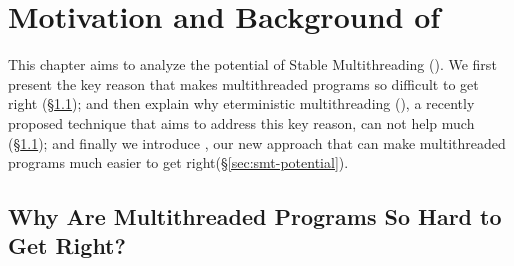 \chapter{Motivation and Background of \smt} \label{sec:smt-motivation}

This chapter aims to analyze the potential of Stable Multithreading (\smt). We
first present the key reason that makes multithreaded programs so difficult to
get right (\S\ref{sec:smt-why}); and then explain why eterministic
multithreading (\dmt), a recently proposed technique that aims to address this
key reason, can not help much (\S\ref{sec:smt-why}); and finally we introduce
\smt, our new approach that can make multithreaded programs much easier to get
right(\S\ref{sec:smt-potential}).

\section{Why Are Multithreaded Programs So Hard to Get Right?}
\label{sec:smt-why}

